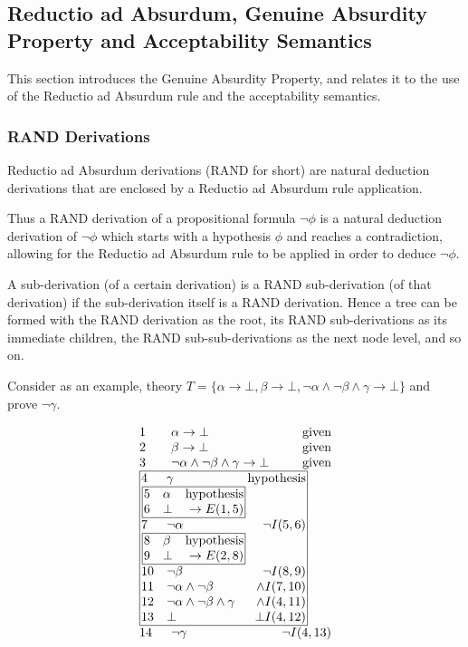 \documentclass[11pt,twoside,a4paper]{report}
\begin{document}
\subsection{Reductio ad Absurdum, Genuine Absurdity Property and Acceptability Semantics}
This section introduces the Genuine Absurdity Property, and relates it to the use of the Reductio ad Absurdum rule and the acceptability semantics.

\subsubsection{RAND Derivations}
\label{subsec:rand}
Reductio ad Absurdum derivations (RAND for short) are natural deduction derivations that are enclosed by a Reductio ad Absurdum rule application. 

Thus a RAND derivation of a propositional formula $\neg\phi$ is a natural deduction derivation of $\neg\phi$ which starts with a hypothesis $\phi$ and reaches a contradiction, allowing for the Reductio ad Absurdum rule to be applied in order to deduce $\neg\phi$.

A sub-derivation (of a certain derivation) is a RAND sub-derivation (of that derivation) if the sub-derivation itself is a RAND derivation. Hence a tree can be formed with the RAND derivation as the root, its RAND sub-derivations as its immediate children, the RAND sub-sub-derivations as the next node level, and so on.

Consider as an example, theory $T = \{\alpha\rightarrow\bot, \beta\rightarrow\bot, \neg\alpha\wedge\neg\beta\wedge\gamma\rightarrow\bot\}$ and prove $\neg\gamma$.

\[\vbox{\offinterlineskip\halign{
&\tabskip=1.5em#\strut&$#$\hfil\tabskip=1em&\hfil$#$\tabskip=0em\cr
%
1&\alpha\rightarrow\bot&\mbox{given}\cr
2&\beta\rightarrow\bot&\mbox{given}\cr
3&\neg\alpha\wedge\neg\beta\wedge\gamma\rightarrow\bot&\mbox{given}\cr
%
\multispan3\vbox{\halign{
\vrule#&&\hskip.1em\tabskip=1em#\strut&$#$\hfil\tabskip=1em&\hfil$#$\hskip0.1em\tabskip=0em&\vrule#\cr
\noalign{\hrule}
%
&4&\gamma&\mbox{hypothesis}&\cr
%
&\multispan3\,\vbox{\halign{
\vrule#&&\hskip.1em\tabskip=1em#\strut&$#$\hfil\tabskip=1em&\hfil$#$\hskip0.1em\tabskip=0em&\vrule#\cr
\noalign{\hrule}
%
&5&\alpha&\mbox{hypothesis}&\cr
&6&\bot&\rightarrow E(1,5)&\cr
%
\noalign{\hrule}}}\,&\cr
%
&7&\neg\alpha&\neg I(5,6)&\cr
%
&\multispan3\,\vbox{\halign{
\vrule#&&\hskip.1em\tabskip=1em#\strut&$#$\hfil\tabskip=1em&\hfil$#$\hskip0.1em\tabskip=0em&\vrule#\cr
\noalign{\hrule}
%
&8&\beta&\mbox{hypothesis}&\cr
&9&\bot&\rightarrow E(2,8)&\cr
%
\noalign{\hrule}}}\,&\cr
%
&10&\neg\beta&\neg I(8,9)&\cr
&11&\neg\alpha\wedge\neg\beta&\wedge I(7,10)&\cr
&12&\neg\alpha\wedge\neg\beta\wedge\gamma&\wedge I(4,11)&\cr
&13&\bot&\bot I(4,12)&\cr
%
\noalign{\hrule}}}\,\cr
%
14&\neg\gamma&\neg I(4,13)\cr
}}\]
\end{document}
